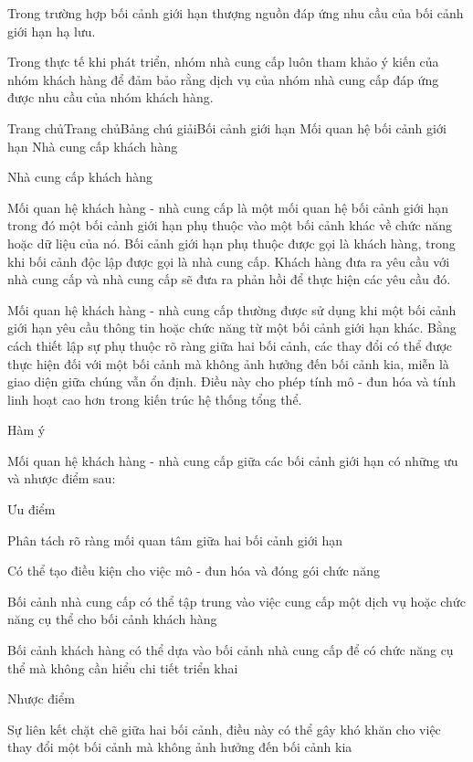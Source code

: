 
Trong trường hợp bối cảnh giới hạn thượng nguồn đáp ứng nhu cầu của bối cảnh giới hạn hạ lưu.

Trong thực tế khi phát triển, nhóm nhà cung cấp luôn tham khảo ý kiến của nhóm khách hàng để đảm bảo rằng dịch vụ của nhóm nhà cung cấp đáp ứng được nhu cầu của nhóm khách hàng.



Trang chủTrang chủBảng chú giảiBối cảnh giới hạn Mối quan hệ bối cảnh giới hạn Nhà cung cấp khách hàng

Nhà cung cấp khách hàng

Mối quan hệ khách hàng - nhà cung cấp là một mối quan hệ bối cảnh giới hạn trong đó một bối cảnh giới hạn phụ thuộc vào một bối cảnh khác về chức năng hoặc dữ liệu của nó. Bối cảnh giới hạn phụ thuộc được gọi là khách hàng, trong khi bối cảnh độc lập được gọi là nhà cung cấp. Khách hàng đưa ra yêu cầu với nhà cung cấp và nhà cung cấp sẽ đưa ra phản hồi để thực hiện các yêu cầu đó.

Mối quan hệ khách hàng - nhà cung cấp thường được sử dụng khi một bối cảnh giới hạn yêu cầu thông tin hoặc chức năng từ một bối cảnh giới hạn khác. Bằng cách thiết lập sự phụ thuộc rõ ràng giữa hai bối cảnh, các thay đổi có thể được thực hiện đối với một bối cảnh mà không ảnh hưởng đến bối cảnh kia, miễn là giao diện giữa chúng vẫn ổn định. Điều này cho phép tính mô - đun hóa và tính linh hoạt cao hơn trong kiến trúc hệ thống tổng thể.

Hàm ý

Mối quan hệ khách hàng - nhà cung cấp giữa các bối cảnh giới hạn có những ưu và nhược điểm sau:

Ưu điểm

Phân tách rõ ràng mối quan tâm giữa hai bối cảnh giới hạn

Có thể tạo điều kiện cho việc mô - đun hóa và đóng gói chức năng

Bối cảnh nhà cung cấp có thể tập trung vào việc cung cấp một dịch vụ hoặc chức năng cụ thể cho bối cảnh khách hàng

Bối cảnh khách hàng có thể dựa vào bối cảnh nhà cung cấp để có chức năng cụ thể mà không cần hiểu chi tiết triển khai

Nhược điểm

Sự liên kết chặt chẽ giữa hai bối cảnh, điều này có thể gây khó khăn cho việc thay đổi một bối cảnh mà không ảnh hưởng đến bối cảnh kia

